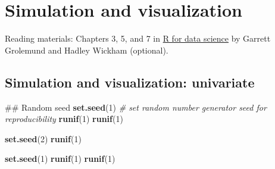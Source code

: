 \documentclass[12pt,]{book}
\newenvironment{Shaded}{\begin{snugshade}}{\end{snugshade}}
\newcommand{\KeywordTok}[1]{\textcolor[rgb]{0.13,0.29,0.53}{\textbf{#1}}}
\newcommand{\DecValTok}[1]{\textcolor[rgb]{0.00,0.00,0.81}{#1}}
\newcommand{\CommentTok}[1]{\textcolor[rgb]{0.56,0.35,0.01}{\textit{#1}}}
\newcommand{\NormalTok}[1]{#1}
\begin{document}
\chapter{Simulation and visualization}\label{ch:sim}

Reading materials: Chapters 3, 5, and 7 in
\href{https://r4ds.had.co.nz/index.html}{R for data science} by Garrett
Grolemund and Hadley Wickham (optional).

\section{Simulation and visualization:
univariate}\label{simulation-and-visualization-univariate}

\begin{Shaded}
\begin{Highlighting}[]
\NormalTok{## Random seed}
\KeywordTok{set.seed}\NormalTok{(}\DecValTok{1}\NormalTok{) }\CommentTok{# set random number generator seed for reproducibility}
\KeywordTok{runif}\NormalTok{(}\DecValTok{1}\NormalTok{)}
\KeywordTok{runif}\NormalTok{(}\DecValTok{1}\NormalTok{) }

\KeywordTok{set.seed}\NormalTok{(}\DecValTok{2}\NormalTok{)}
\KeywordTok{runif}\NormalTok{(}\DecValTok{1}\NormalTok{)}

\KeywordTok{set.seed}\NormalTok{(}\DecValTok{1}\NormalTok{)}
\KeywordTok{runif}\NormalTok{(}\DecValTok{1}\NormalTok{)}
\KeywordTok{runif}\NormalTok{(}\DecValTok{1}\NormalTok{)}
\end{Highlighting}
\end{Shaded}
\end{document}
